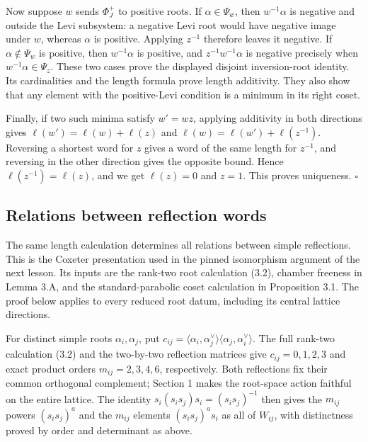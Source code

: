 \documentclass[11pt,a4paper,openany]{report}
\begin{document}
Now suppose \(w\) sends \(\Phi_J^+\) to positive roots. If \(\alpha\in\Psi_w\), then \(w^{-1}\alpha\) is negative and outside the Levi subsystem: a negative Levi root would have negative image under \(w\), whereas \(\alpha\) is positive. Applying \(z^{-1}\) therefore leaves it negative. If \(\alpha\notin\Psi_w\) is positive, then \(w^{-1}\alpha\) is positive, and \(z^{-1}w^{-1}\alpha\) is negative precisely when \(w^{-1}\alpha\in\Psi_z\). These two cases prove the displayed disjoint inversion-root identity. Its cardinalities and the length formula prove length additivity. They also show that any element with the positive-Levi condition is a minimum in its right coset.

Finally, if two such minima satisfy \(w'=wz\), applying additivity in both directions gives \(\ell(w')=\ell(w)+\ell(z)\) and \(\ell(w)=\ell(w')+\ell(z^{-1})\). Reversing a shortest word for \(z\) gives a word of the same length for \(z^{-1}\), and reversing in the other direction gives the opposite bound. Hence \(\ell(z^{-1})=\ell(z)\), and we get \(\ell(z)=0\) and \(z=1\). This proves uniqueness. \(\square\)

\subsection{Relations between reflection words}\label{AG-RG-04-relations-between-reflection-words}

The same length calculation determines all relations between simple reflections. This is the Coxeter presentation used in the pinned isomorphism argument of the next lesson. Its inputs are the rank-two root calculation (3.2), chamber freeness in Lemma 3.A, and the standard-parabolic coset calculation in Proposition 3.1. The proof below applies to every reduced root datum, including its central lattice directions.

For distinct simple roots \(\alpha_i,\alpha_j\), put \(c_{ij}=\langle\alpha_i,\alpha_j^\vee\rangle\langle\alpha_j,\alpha_i^\vee\rangle\). The full rank-two calculation (3.2) and the two-by-two reflection matrices give \(c_{ij}=0,1,2,3\) and exact product orders \(m_{ij}=2,3,4,6\), respectively. Both reflections fix their common orthogonal complement; Section 1 makes the root-space action faithful on the entire lattice. The identity \(s_i(s_is_j)s_i=(s_is_j)^{-1}\) then gives the \(m_{ij}\) powers \((s_is_j)^a\) and the \(m_{ij}\) elements \((s_is_j)^as_i\) as all of \(W_{ij}\), with distinctness proved by order and determinant as above.
\end{document}
